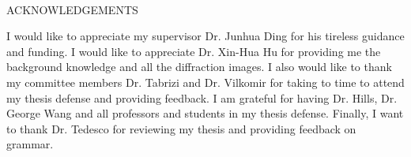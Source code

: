 
\renewcommand{\baselinestretch}{2}
\small\normalsize
\hbox{\ }
\thispagestyle{empty} 
\vspace{-.65in}

\begin{center}
\large{ACKNOWLEDGEMENTS} 
\end{center} 

\vspace{1ex}

I would like to appreciate my supervisor Dr. Junhua Ding for his tireless guidance and funding. I would like to appreciate Dr. Xin-Hua Hu for providing me the background knowledge and all the diffraction images. I also would like to thank my committee members Dr. Tabrizi and Dr. Vilkomir for taking to time to attend my thesis defense and providing feedback. I am  grateful for having Dr. Hills, Dr. George Wang and all professors and students in my thesis defense. Finally, I want to thank Dr. Tedesco for reviewing my thesis and providing feedback on grammar.  
